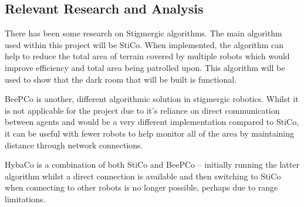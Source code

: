 \subsection{Relevant Research and Analysis} \label{desResAnal}
There has been some research on Stigmergic algorithms.  The main algorithm used
within this project will be 
StiCo\cite{Ranjbar-Sahraei2012,Ranjbar-Sahraei2012Demo,Ranjbar-Sahraei2013}.
When implemented, the algorithm can help to reduce the total area of terrain
covered by multiple robots which would improve efficiency and total area 
being patrolled upon.  This algorithm will be used to show that the dark room
that will be built is functional.

BeePCo is another, different algorithmic solution in stigmergic robotics.  
Whilst it is not applicable for the project due to it's reliance on direct
communication between agents and would be a very different implementation 
compared to StiCo, it can be useful with fewer robots to help monitor all of the
area by maintaining distance through network connections.

HybaCo is a combination of both StiCo and BeePCo -- initially running the latter
algorithm whilst a direct connection is available and then switching to StiCo
when connecting to other robots is no longer possible, perhaps due to range
limitations\cite{Broecker2015}.


